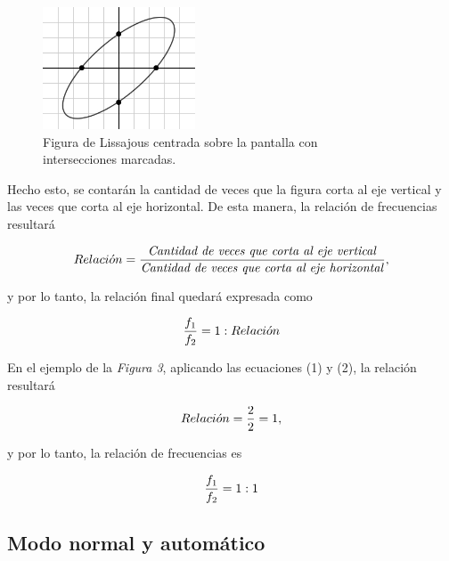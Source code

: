 \documentclass{article}
\begin{document}
\begin{figure}[h]
	\centering
	\includegraphics[width=0.4039\textwidth]{images/03-lissajouse-calculo-relacion.jpg}
	\medskip
	\caption{Figura de Lissajous centrada sobre la pantalla con\\ intersecciones marcadas.}
\end{figure}
\bigskip\bigskip


\noindent Hecho esto, se contarán la cantidad de veces que la figura corta al eje vertical y las veces que corta al eje horizontal. De esta manera, la relación de frecuencias resultará
\bigskip


\begin{equation}
	Relaci\acute{o}n = {\textrm{\textit{Cantidad de veces que corta al eje vertical}} \over \textrm{\textit{Cantidad de veces que corta al eje horizontal}}},
\end{equation}
\bigskip


\noindent y por lo tanto, la relación final quedará expresada como
\bigskip


\begin{equation}
	{f_1 \over f_2} = 1:Relaci\acute{o}n
\end{equation}
\bigskip


\noindent En el ejemplo de la \textit{Figura 3}, aplicando las ecuaciones (1) y (2), la relación resultará
\medskip


\begin{equation*}
	Relaci\acute{o}n = {2 \over 2} = 1,
\end{equation*}
\medskip


\noindent y por lo tanto, la relación de frecuencias es
\medskip


\begin{equation*}
	{f_1 \over f_2} = 1:1
\end{equation*}
\bigskip



\subsection{Modo normal y automático}
\end{document}
